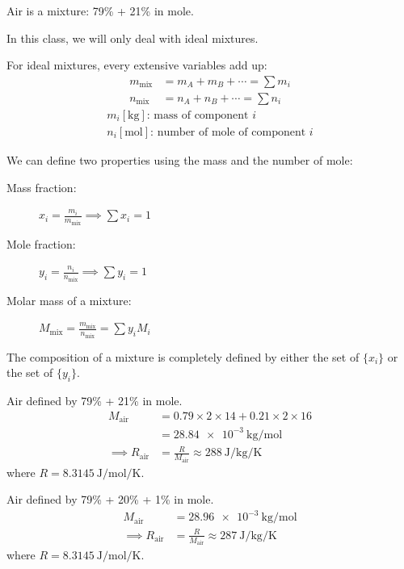 \documentclass[10pt, twocolumn]{article}
\begin{document}
\begin{example}
  Air is a mixture: 79\%  + 21\%  in mole.
\end{example}

In this class, we will only deal with ideal mixtures.

For ideal mixtures, every extensive variables add up:
\begin{align*}
  m_\mathrm{mix} & = m_A + m_B + \cdots = \sum{m_i} \\
  n_\mathrm{mix} & = n_A + n_B + \cdots = \sum{n_i}
\end{align*}
\[
  \begin{array}{|l}
    m_i [\si{\kilogram}] \text{: mass of component } i \\
    n_i [\si{\mole}] \text{: number of mole of component } i
  \end{array}
\]

We can define two properties using the mass and the number of mole:
\begin{description}
  \item[Mass fraction:] \(x_i = \frac{m_i}{m_\mathrm{mix}} \implies \sum{x_i} = 1\)
  \item[Mole fraction:] \(y_i = \frac{n_i}{n_\mathrm{mix}} \implies \sum{y_i} = 1\)
  \item[Molar mass of a mixture:] \(M_\mathrm{mix} = \frac{m_\mathrm{mix}}{n_\mathrm{mix}} = \sum{y_i M_i}\)
\end{description}
The composition of a mixture is completely defined by either the set of \(\{x_i\}\) or the set of \(\{y_i\}\).

\begin{example}
  Air defined by 79\%  + 21\%  in mole.
  \begin{align*}
    M_\mathrm{air}          & = 0.79 \times 2 \times 14 + 0.21 \times 2 \times 16                         \\
                            & = \SI{28.84e-3}{\kilogram\per\mole}                                         \\
    \implies R_\mathrm{air} & = \frac{R}{M_\mathrm{air}} \approx \SI{288}{\joule\per\kilogram\per\kelvin}
  \end{align*}
  where \(R = \SI{8.3145}{\joule\per\mole\per\kelvin}\).
\end{example}

\begin{example}
  Air defined by 79\%  + 20\%  + 1\%  in mole.
  \begin{align*}
    M_\mathrm{air}          & = \SI{28.96e-3}{\kilogram\per\mole}                                         \\
    \implies R_\mathrm{air} & = \frac{R}{M_\mathrm{air}} \approx \SI{287}{\joule\per\kilogram\per\kelvin}
  \end{align*}
  where \(R = \SI{8.3145}{\joule\per\mole\per\kelvin}\).
\end{example}
\end{document}
